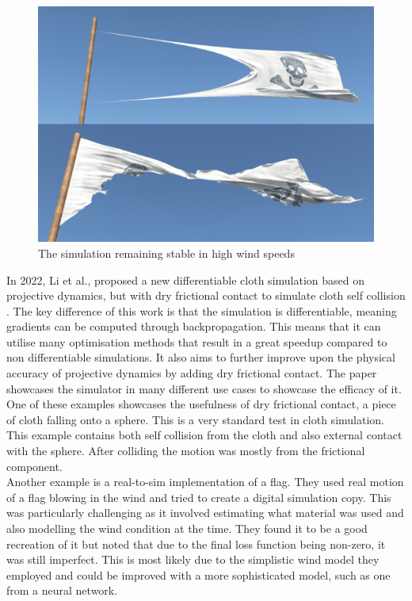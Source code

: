 \documentclass[12pt,a4paper]{article}
\begin{document}
\begin{figure}
	\centering
	\includegraphics[scale=0.5]{PDFlag.png}
	\caption{The simulation remaining stable in high wind speeds}
	\label{fig:pd}
\end{figure}

In 2022, Li et al., proposed a new differentiable cloth simulation based on projective dynamics, but with dry frictional contact to simulate cloth self collision \cite{diffCloth}. The key difference of this work is that the simulation is differentiable, meaning gradients can be computed through backpropagation. This means that it can utilise many optimisation methods that result in a great speedup compared to non differentiable simulations. It also aims to  further improve upon the physical accuracy of projective dynamics by adding dry frictional contact. The paper showcases the simulator in many different use cases to showcase the efficacy of it.
\\
One of these examples showcases the usefulness of dry frictional contact, a piece of cloth falling onto a sphere. This is a very standard test in cloth simulation. This example contains both self collision from the cloth and also external contact with the sphere. After colliding the motion was mostly from the frictional component.
\\

Another example is a real-to-sim implementation of a flag. They used real motion of a flag blowing in the wind and tried to create a digital simulation copy. This was particularly challenging as it involved estimating what material was used and also modelling the wind condition at the time. They found it to be a good recreation of it but noted that due to the final loss function being non-zero, it was still imperfect. This is most likely due to the simplistic wind model they employed and could be improved with a more sophisticated model, such as one from a neural network.
\\
\end{document}

